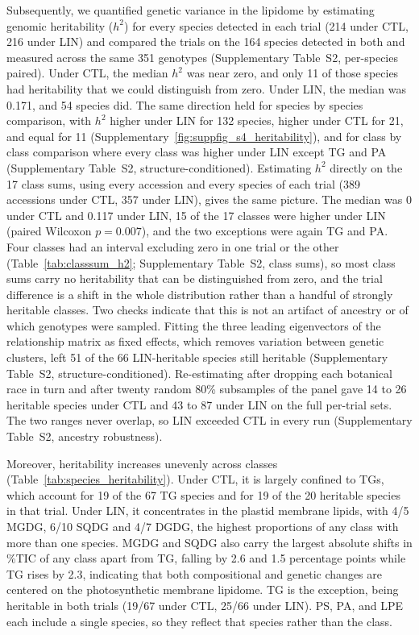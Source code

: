 \documentclass[9pt,twocolumn,twoside]{rilabRxiv}
\begin{document}
Subsequently, we quantified genetic variance in the lipidome by estimating genomic heritability ($h^2$) for every species detected in each trial (214 under CTL, 216 under LIN) and compared the trials on the 164 species detected in both and measured across the same 351 genotypes (Supplementary Table~S2, per-species paired). Under CTL, the median $h^2$ was near zero, and only 11 of those species had heritability that we could distinguish from zero. Under LIN, the median was 0.171, and 54 species did. The same direction held for species by species comparison, with $h^2$ higher under LIN for 132 species, higher under CTL for 21, and equal for 11 (Supplementary~\ref{fig:suppfig_s4_heritability}), and for class by class comparison where every class was higher under LIN except TG and PA (Supplementary Table~S2, structure-conditioned). Estimating $h^2$ directly on the 17 class sums, using every accession and every species of each trial (389 accessions under CTL, 357 under LIN), gives the same picture. The median was 0 under CTL and 0.117 under LIN, 15 of the 17 classes were higher under LIN (paired Wilcoxon $p=0.007$), and the two exceptions were again TG and PA. Four classes had an interval excluding zero in one trial or the other (Table~\ref{tab:classsum_h2}; Supplementary Table~S2, class sums), so most class sums carry no heritability that can be distinguished from zero, and the trial difference is a shift in the whole distribution rather than a handful of strongly heritable classes. Two checks indicate that this is not an artifact of ancestry or of which genotypes were sampled. Fitting the three leading eigenvectors of the relationship matrix as fixed effects, which removes variation between genetic clusters, left 51 of the 66 LIN-heritable species still heritable (Supplementary Table~S2, structure-conditioned). Re-estimating after dropping each botanical race in turn and after twenty random 80\% subsamples of the panel gave 14 to 26 heritable species under CTL and 43 to 87 under LIN on the full per-trial sets. The two ranges never overlap, so LIN exceeded CTL in every run (Supplementary Table~S2, ancestry robustness). 

Moreover, heritability increases unevenly across classes (Table~\ref{tab:species_heritability}). Under CTL, it is largely confined to TGs, which account for 19 of the 67 TG species and for 19 of the 20 heritable species in that trial. Under LIN, it concentrates in the plastid membrane lipids, with 4/5 MGDG, 6/10 SQDG and 4/7 DGDG, the highest proportions of any class with more than one species. MGDG and SQDG also carry the largest absolute shifts in \%TIC of any class apart from TG, falling by 2.6 and 1.5 percentage points while TG rises by 2.3, indicating that both compositional and genetic changes are centered on the photosynthetic membrane lipidome. TG is the exception, being heritable in both trials (19/67 under CTL, 25/66 under LIN). PS, PA, and LPE each include a single species, so they reflect that species rather than the class.
\end{document}
